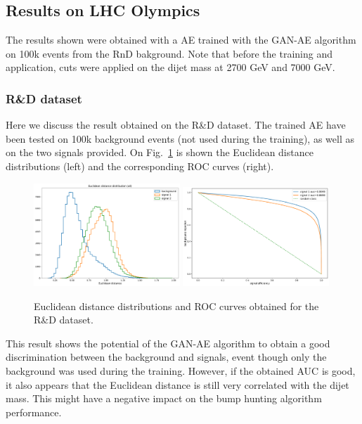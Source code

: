 \documentclass[letterpaper,11pt]{article}
\begin{document}
\subsection{Results on LHC Olympics}
\label{sec:results}

\noindent The results shown were obtained with a AE trained with the GAN-AE algorithm on 100k events from the RnD bakground.
Note that before the training and application, cuts were applied on the dijet mass at 2700 GeV and 7000 GeV.


\subsubsection{R\&D dataset}
\label{sec:RnD}

\noindent Here we discuss the result obtained on the R\&D dataset.
The trained AE have been tested on 100k background events (not used during the training), as well as on the two signals provided.
On Fig.~\ref{fig:GAE_RnD} is shown the Euclidean distance distributions (left) and the corresponding ROC curves (right).\\

\begin{figure}[h!]
\centering
\includegraphics[width=0.49\textwidth]{img/RnD_single_distance_all.pdf}
\includegraphics[width=0.49\textwidth]{img/RnD_single_ROC_all.pdf}
\caption{Euclidean distance distributions and ROC curves obtained for the R\&D dataset.}
\label{fig:GAE_RnD}
\end{figure}

\noindent This result shows the potential of the GAN-AE algorithm to obtain a good discrimination between the background and signals, event though only the background was used during the training.
However, if the obtained AUC is good, it also appears that the Euclidean distance is still very correlated with the dijet mass.
This might have a negative impact on the bump hunting algorithm performance.
\end{document}
